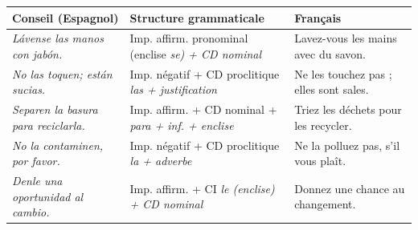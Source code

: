 \documentclass[11pt]{article}
\newcommand{\esp}[1]{\ifmmode\text{\textit{#1}}\else\begingroup\selectlanguage{spanish}\itshape #1\endgroup\fi}
\begin{document}
\begin{exemplebox}
\begin{center}
\begin{tabularx}{\linewidth}{|X|X|X|}
\hline
\rowcolor{popblueL} \textbf{Conseil (Espagnol)} & \textbf{Structure grammaticale} & \textbf{Français} \\
\hline
\esp{Lávense las manos con jabón.} & Imp. affirm. pronominal (enclise \esp{se}) + CD nominal & Lavez-vous les mains avec du savon. \\
\hline
\esp{No las toquen; están sucias.} & Imp. négatif + CD proclitique \esp{las} + justification & Ne les touchez pas ; elles sont sales. \\
\hline
\esp{Separen la basura para reciclarla.} & Imp. affirm. + CD nominal + \esp{para} + inf. + enclise & Triez les déchets pour les recycler. \\
\hline
\esp{No la contaminen, por favor.} & Imp. négatif + CD proclitique \esp{la} + adverbe & Ne la polluez pas, s'il vous plaît. \\
\hline
\esp{Denle una oportunidad al cambio.} & Imp. affirm. + CI \esp{le} (enclise) + CD nominal & Donnez une chance au changement. \\
\hline
\end{tabularx}
\end{center}
\end{exemplebox}
\end{document}
